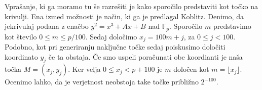 \documentclass[12pt,a4paper,twoside]{article}
\newcommand{\literatura}{literatura}  %
\theoremstyle{definition} %
\theoremstyle{plain} %
\numberwithin{equation}{section}  %
\newcommand{\F}{\mathbb F}
\begin{document}
Vprašanje, ki ga moramo tu še razrešiti je kako sporočilo predstaviti kot točko na krivulji. Ena izmed možnosti je način, ki ga je predlagal Koblitz. Denimo, da jekrivulaj podana z enačbo
$y^2 = x^3+Ax+B$ nad $\F_p$. Sporočilo $m$ predstavimo kot število $0 \leq m \leq p/100$. Sedaj določimo $x_j = 100m+j$, za $0\leq j < 100$. Podobno, kot pri generiranju naključne točke sedaj poiskusimo določiti koordinato $y_j$ če ta obstaja. Če smo uspeli poračunati obe koordianti je naša točka $M=(x_j,y_j)$. Ker velja $0\leq x_j < p+100$ je $m$ določen kot
$m = \lfloor x_j \rfloor$.
Ocenimo lahko, da je verjetnost neobstoja take točke približno $2^{-100}$.

\cite{Washington2008}
\cite{Silverman2009}
\cite{Miller}
\cite{Jeffrey2008}
\cite{Lynn2007}







\cleardoublepage                           %

\cleardoublepage                           %
\printindex
\end{document}
